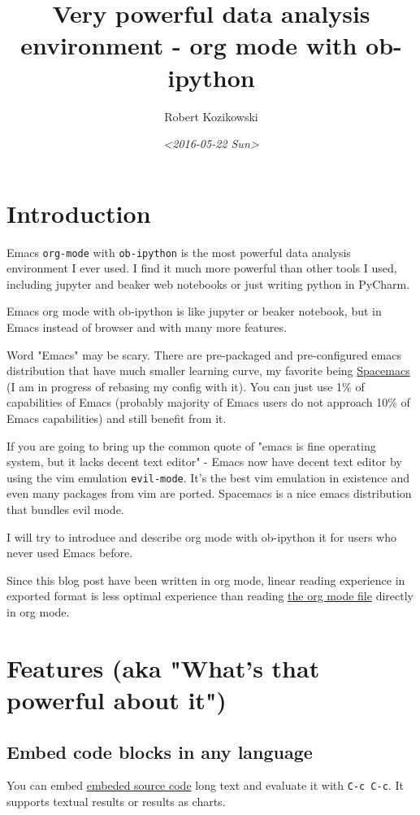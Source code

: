 \documentclass[11pt]{article}
\author{Robert Kozikowski}
\date{\textit{<2016-05-22 Sun>}}
\title{Very powerful data analysis environment - org mode with ob-ipython}
\begin{document}
\maketitle
\tableofcontents


\section{Introduction}
\label{sec:orgheadline1}
Emacs \texttt{org-mode} with \texttt{ob-ipython} is the most powerful data analysis environment I ever used.
I find it much more powerful than other tools I used, including jupyter and beaker web notebooks or just writing python in PyCharm.

Emacs org mode with ob-ipython is like jupyter or beaker notebook, but in Emacs instead of browser and with many more features.

Word "Emacs" may be scary. There are pre-packaged and pre-configured emacs distribution that have much smaller learning curve, my favorite being \href{http://spacemacs.org/}{Spacemacs} (I am in progress of rebasing my config with it).
You can just use 1\% of capabilities of Emacs (probably majority of Emacs users do not approach 10\% of Emacs capabilities) and still benefit from it.

If you are going to bring up the common quote of "emacs is fine operating system, but it lacks decent text editor" -
Emacs now have decent text editor by using the vim emulation \texttt{evil-mode}. It's the best vim emulation in existence
and even many packages from vim are ported. Spacemacs is a nice emacs distribution that bundles evil mode.

I will try to introduce and describe org mode with ob-ipython it for users who never used Emacs before.

Since this blog post have been written in org mode, linear reading experience in exported format is less optimal experience than reading \href{https://github.com/kozikow/kozikow-blog/blob/master/ob_ipython/ipython.org}{the org mode file} directly in org mode.
\section{Features (aka "What's that powerful about it")}
\label{sec:orgheadline28}
\subsection{Embed code blocks in any language}
\label{sec:orgheadline3}
You can embed \href{http://orgmode.org/manual/Working-With-Source-Code.html}{embeded source code} long text and evaluate it with \texttt{C-c C-c}.
It supports textual results or results as charts.
\end{document}
